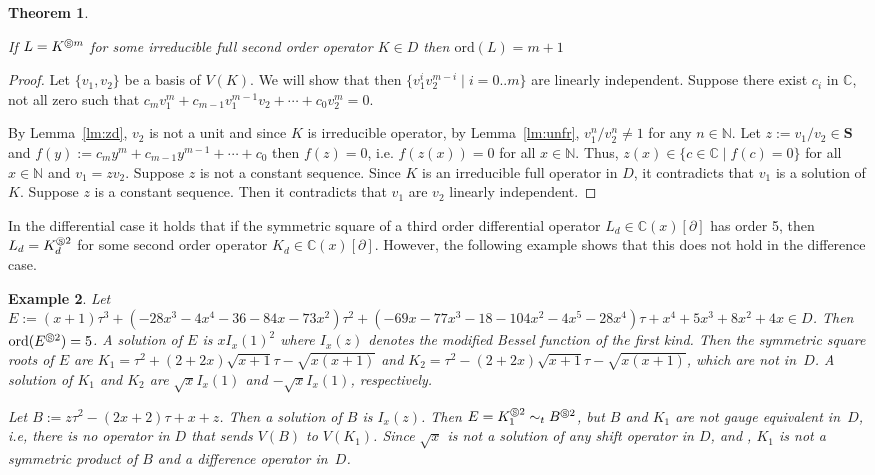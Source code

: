 \documentclass{article}
\newtheorem{theorem}{Theorem}[section]
\newtheorem{example}[theorem]{Example}
\newcommand{\C}{{\mathbb{C}}} \newcommand{\N}{{\mathbb{N}}}
\newcommand{\ord}{\mathrm{ord}}
\newcommand{\cS}{\circledS}
\newcommand{\Seq}{\mathbf{S}}
\begin{document}
\begin{theorem}\label{thm:nonvan}

  If $L=K^{\cS m}$ for some irreducible full second order operator $K \in D$ then $\ord(L)=m+1$

\end{theorem}
\begin{proof} 

   Let $\{ v_1, v_2 \}$ be a basis of $V(K)$. We will show that then $\{v_1^iv_2^{m-i} \mid
  i=0..m \}$ are linearly independent.  Suppose there exist $c_i$ in $\C$, not all zero
  such that $c_m v_1^m+c_{m-1} v_1^{m-1}v_2+\cdots+c_0 v_2^m=0$.  
  
  By Lemma~\ref{lm:zd}, $v_2$ is not a unit and since $K$ is irreducible operator, by
  Lemma~\ref{lm:unfr}, $v_1^{n}/v_2^{n} \neq 1$ for any $n \in \N$.  Let $z:=v_1/v_2 \in
  \Seq$ and $f(y):=c_m y^m+c_{m-1}y^{m-1}+\cdots+c_0$ then $f(z)=0$, i.e. $f(z(x))=0$ for
  all $x \in \N$.  Thus, $z(x) \in \{ c \in \C \mid f(c)=0 \}$ for all $x \in \N$ and
  $v_1=zv_2$. Suppose $z$ is not a constant sequence. Since $K$ is an irreducible full operator
  in $D$, it contradicts that $v_1$ is a solution of $K$.  Suppose $z$ is a constant
  sequence. Then it contradicts that $v_1$ are $v_2$ linearly independent.
\end{proof}




In the differential case it holds that if the symmetric square of a third order
differential operator $L_d \in \C(x)[\partial]$ has order 5, then $L_d=K_d^{\cS 2}$ for
some second order operator $K_d \in \C(x)[\partial]$.  However, the following example
shows that this does not hold in the difference case.

\begin{example}
\label{example:symp}
Let $E:=( x+1) {\tau}^{3}+ ( -28{x}^{3}-4{x}^{4}-36-84 x-73{x}^{2}) {\tau}^{2}+ (
-69x-77{x}^{3}-18-104{x }^{2}-4{x}^{5}-28{x}^{4} ) \tau+{x}^{4}+5{x}^{3}+8{x}^{2 }+4x \in
D$. Then $\ord(E^{\cS 2})=5$. A solution of $E$ is $x I_x(1)^2$ where $I_x(z)$ denotes the
modified Bessel function of the first kind.  Then the symmetric square roots of $E$ are
$K_{1}=\tau^2+(2+2x)\sqrt{x+1}\tau-\sqrt{x(x+1)}$ and
$K_{2}=\tau^2-(2+2x)\sqrt{x+1}\tau-\sqrt{x(x+1)}$, which are not in~$D$.  A solution of
$K_{1}$ and $K_{2}$ are $\sqrt{x}I_x(1)$ and $-\sqrt{x}I_x(1)$, respectively.




Let $B:=z\tau^2-(2x+2)\tau+x+z$. Then a solution of $B$ is $I_x(z)$.  Then $E=K_{1}^{\cS2}
\sim_t B^{\cS2}$, but $B$ and $K_{1}$ are not gauge equivalent in~$D$, i.e, there is no
operator in $D$ that sends $V(B)$ to $V(K_{1})$.
Since $\sqrt{x}$ is not a solution of 
any shift operator in $D$, \cite[Theorem 5.2]{FlajoletGerholdSalvy05}and \cite[Lemma A.2]{Chen2012111}, $K_{1}$ is not a symmetric product of $B$ and a difference
operator in~$D$.


\end{example}
\end{document}
